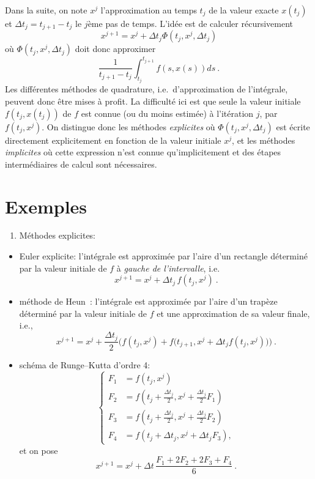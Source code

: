 Dans la suite, on note \(x^j\) l'approximation au temps \(t_j\) de la
valeur exacte \(x(t_j)\) et \({\Delta t}_j = t_{j+1}-t_j\) le \(j\)ème
pas de temps. L'idée est de calculer récursivement \[
x^{j+1} = x^j + {\Delta t}_j \Phi(t_j,x^j,{\Delta t}_j)
\] où \(\Phi(t_j,x^j,{\Delta t}_j)\) doit donc approximer \[
\frac{1}{t_{j+1}-t_j} \int_{t_j}^{t_{j+1}}f(s,x(s)) ds \ .
\] Les différentes méthodes de quadrature, i.e.~d'approximation de
l'intégrale, peuvent donc être mises à profit. La difficulté ici est que
seule la valeur initiale \(f(t_j,x(t_j))\) de \(f\) est connue (ou du
moins estimée) à l'itération \(j\), par \(f(t_j,x^j)\). On distingue
donc les méthodes \emph{explicites} où \(\Phi(t_j,x^j,{\Delta t}_j)\)
est écrite directement explicitement en fonction de la valeur initiale
\(x^j\), et les méthodes \emph{implicites} où cette expression n'est
connue qu'implicitement et des étapes intermédiaires de calcul sont
nécessaires.

\hypertarget{ed2-exemples}{%
\section{Exemples}\label{ed2-exemples}}

\begin{enumerate}
\def\labelenumi{\arabic{enumi}.}
\tightlist
\item
  Méthodes explicites:
\end{enumerate}

\begin{itemize}
\item
  Euler explicite: l'intégrale est approximée par l'aire d'un rectangle
  déterminé par la valeur initiale de \(f\) à \emph{gauche de
  l'intervalle}, i.e.\\
  \[
    x^{j+1} = x^j + {\Delta t}_j \, f(t_j,x^j) \ .
    \]
\item
  méthode de Heun~: l'intégrale est approximée par l'aire d'un trapèze
  déterminé par la valeur initiale de \(f\) et une approximation de sa
  valeur finale, i.e., \[
    x^{j+1} = x^j+\frac{{\Delta t}_j}{2}\Big(f(t_j,x^j) + f\big(t_{j+1},x^j+{\Delta t}_j f(t_j,x^j)\big) \Big) \ .
    \]
\item
  schéma de Runge--Kutta d'ordre 4: \[
  \left\{
  \begin{aligned}
  F_1 & = f(t_j,x^{j}) \\
  F_2 & = f\left(t_j+\frac{{\Delta t}_j}{2}, x^{j} + \frac{{\Delta t}_j}{2} F_1\right) \\
  F_3 & = f\left(t_j+\frac{{\Delta t}_j}{2}, x^{j} + \frac{{\Delta t}_j}{2} F_2\right) \\
  F_4 & = f(t_j + {\Delta t}_j, x^j + {\Delta t}_j F_3),
  \end{aligned}
  \right.
  \] et on pose \[
  x^{j+1} = x^{j} + {\Delta t}\, \frac{F_1 + 2F_2 + 2F_3 + F_4}{6} \ .
  \]
\end{itemize}

